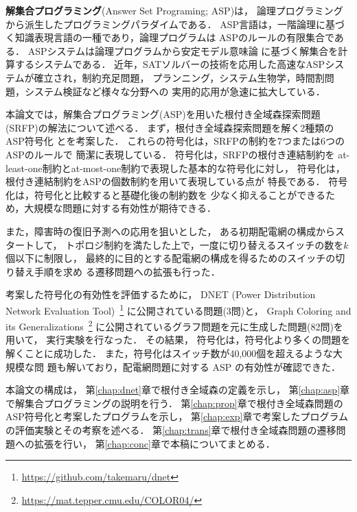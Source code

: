 \textbf{解集合プログラミング}(Answer Set Programing; ASP\cite{%
  Baral03:cambridge,%
  Gelfond88:iclp,%
  Niemela99:amai,%
  Inoue08:jssst})は，
論理プログラミングから派生したプログラミングパラダイムである．
ASP言語は，一階論理に基づく知識表現言語の一種であり，論理プログラムは
ASPのルールの有限集合である．
ASPシステムは論理プログラムから安定モデル意味論\cite{Gelfond88:iclp}
に基づく解集合を計算するシステムである．
近年，SATソルバーの技術を応用した高速なASPシステムが確立され，制約充足問題，
プランニング，システム生物学，時間割問題，システム検証など様々な分野への
実用的応用が急速に拡大している\cite{ASPAISAT}．

本論文では，解集合プログラミング(ASP)を用いた根付き全域森探索問題
(SRFP)の解法について述べる．
まず，根付き全域森探索問題を解く2種類のASP符号化
とを考案した．
これらの符号化は，SRFPの制約を7つまたは6つのASPのルールで
簡潔に表現している．
符号化は，SRFPの根付き連結制約を
at-least-one制約とat-most-one制約で表現した基本的な符号化に対し，
符号化は，根付き連結制約をASPの個数制約を用いて表現している点が
特長である．
符号化は，符号化と比較すると基礎化後の制約数を
少なく抑えることができるため，大規模な問題に対する有効性が期待できる．

また，障害時の復旧予測への応用を狙いとした，
ある初期配電網の構成からスタートして，
トポロジ制約を満たした上で，一度に切り替えるスイッチの数を$k$個以下に制限し，
最終的に目的とする配電網の構成を得るためのスイッチの切り替え手順を求め
る遷移問題への拡張も行った．

考案した符号化の有効性を評価するために，
DNET (Power Distribution Network Evaluation Tool)~\footnote{%
\url{https://github.com/takemaru/dnet}}
に公開されている問題(3問)と，
Graph Coloring and its Generalizations~\footnote{%
\url{https://mat.tepper.cmu.edu/COLOR04/}}
に公開されているグラフ問題を元に生成した問題(82問)を用いて，
実行実験を行なった．
その結果，
符号化は，符号化より多くの問題を
解くことに成功した．
また，符号化はスイッチ数が40,000個を超えるような大規模な問
題も解いており，配電網問題に対する ASP の有効性が確認できた．

本論文の構成は，
第\ref{chap:dnet}章で根付き全域森の定義を示し，
第\ref{chap:asp}章で解集合プログラミングの説明を行う．
第\ref{chap:prop}章で根付き全域森問題のASP符号化と考案したプログラムを示し，
第\ref{chap:exp}章で考案したプログラムの評価実験とその考察を述べる．
第\ref{chap:trans}章で根付き全域森問題の遷移問題への拡張を行い，
第\ref{chap:conc}章で本稿についてまとめる．


